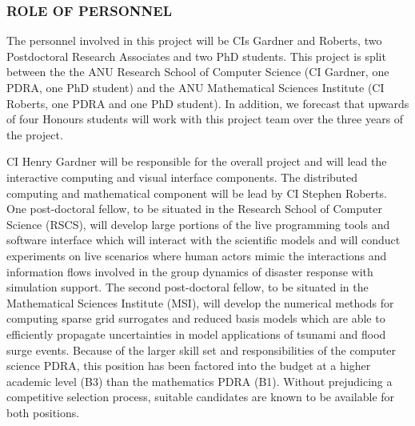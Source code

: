 \documentclass[a4paper,fontsize=12pt]{scrartcl}
\begin{document}
\subsubsection*{ROLE OF PERSONNEL}

%


The personnel involved in this project will be  CIs Gardner and Roberts, two Postdoctoral Research Associates and two PhD
students. This project is split  between the the  ANU Research School of Computer Science (CI Gardner, one PDRA, one PhD student) and the ANU Mathematical Sciences Institute (CI Roberts, one PDRA and one PhD student). In addition, we forecast that upwards of four  Honours students will work with this project team over the three years of the project.

CI Henry Gardner will be responsible for the overall project and will lead the
interactive computing and visual interface components. The distributed computing
and mathematical component will be lead by CI Stephen Roberts. One post-doctoral
fellow, to be situated in the Research School of Computer Science
(RSCS), will develop large portions of the live programming tools and
software interface which will interact with the scientific models and will conduct experiments on live scenarios where human actors mimic the interactions and information flows involved in the group dynamics of disaster response with simulation support. The
second post-doctoral fellow, to be situated in the Mathematical
Sciences Institute (MSI), will develop the numerical methods for
computing sparse grid surrogates and reduced basis models which are
able to efficiently propagate uncertainties in model applications of tsunami and flood surge events. Because of the larger skill set and responsibilities of the computer science PDRA, this position has been factored into the budget at a higher academic level (B3) than the mathematics PDRA (B1). Without prejudicing a competitive selection process, suitable candidates are known to be available for both positions. 
\end{document}
